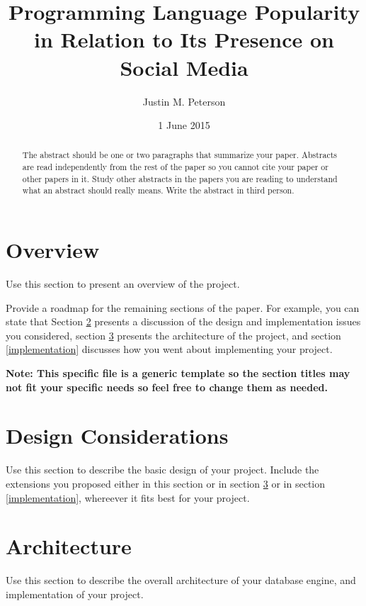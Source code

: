 \documentclass{sig-alternate}
\begin{document}
\title{Programming Language Popularity in Relation to Its Presence on Social Media}
\author{
\alignauthor
Justin M. Peterson
}
\date{1 June 2015}
\maketitle
\begin{abstract}
  The abstract should be one or two paragraphs that
  summarize your paper. Abstracts are read independently
  from the rest of the paper so you cannot cite your paper
  or other papers in it. Study other abstracts in the papers
  you are reading to understand what an abstract should
  really means. Write the abstract in third person.
\end{abstract}

\section{Overview}
\label{overview}

Use this section to present an overview of the project.

Provide a roadmap for the remaining sections of the paper. For
example, you can state that Section \ref{design considerations}
presents a discussion of the design and implementation issues you
considered, section \ref{architecture} presents the architecture of
the project, and section \ref{implementation}
discusses how you went about implementing your project.

{\bf Note: This specific file is a generic template so the
  section titles may not fit your specific needs so feel
  free to change them as needed.}

\section{Design Considerations}
\label{design considerations}

Use this section to describe the basic design of your project. Include
the extensions you proposed either in this section or in section
\ref{architecture} or in section \ref{implementation}, whereever it
fits best for your project.

\section{Architecture}
\label{architecture}

Use this section to describe the overall architecture of your database
engine, and implementation of your
project.
\end{document}
